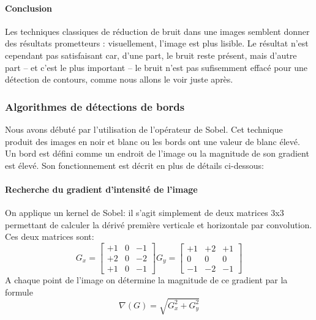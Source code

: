 \documentclass[a4paper, 12pt, titlepage, oneside, french]{article}
\begin{document}
	\pagebreak
	\paragraph{\textbf{Conclusion}}
	Les techniques classiques de réduction de bruit dans une images semblent donner des résultats prometteurs : visuellement, l'image est plus lisible. Le résultat n'est cependant pas satisfaisant car, d'une part, le bruit reste présent, mais d'autre part -- et c'est le plus important -- le bruit n'est pas sufisemment effacé pour une détection de contours, comme nous allons le voir juste après.

	\pagebreak

	\subsubsection{Algorithmes de détections de bords}
	Nous avons débuté par l'utilisation de l'opérateur de Sobel. Cet technique produit des images en noir et blanc ou les bords ont une valeur de blanc élevé. Un bord est défini comme un endroit de l'image ou la magnitude de son gradient est élevé. Son fonctionnement est décrit en plus de détails ci-dessous: 
		\paragraph{\textbf{Recherche du gradient d'intensité de l'image}}
				On applique un kernel de Sobel: il s'agit simplement de deux matrices 3x3 permettant de calculer la dérivé première verticale et horizontale par convolution. Ces deux matrices sont:
				\\ \[G_x = \begin{bmatrix}  +1  & 0 & -1 \\ +2 & 0 & -2  \\ +1 &  0 & -1\end{bmatrix} 
					G_y = \begin{bmatrix} +1 & +2 & +1  \\  0 & 0 &  0  \\ -1 & -2 & -1\end{bmatrix}\]
						A chaque point de l'image on détermine la magnitude de ce gradient par la formule
					\[\nabla(G) = \sqrt{G_x^2 + G_y^2}\]
\end{document}
